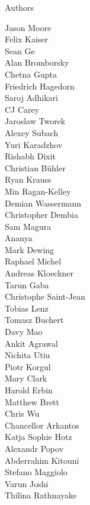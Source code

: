 \documentclass[xcolor=svgnames]{beamer}
\begin{document}
\begin{frame}{Authors}
\begin{multicols}{5}
Jason Moore\\
Felix Kaiser\\
Sean Ge\\
Alan Bromborsky\\
Chetna Gupta\\
Friedrich Hagedorn\\
Saroj Adhikari\\
CJ Carey\\
Jaroslaw Tworek\\
Alexey Subach\\
Yuri Karadzhov\\
Rishabh Dixit\\
Christian Bühler\\
Ryan Krauss\\
Min Ragan-Kelley\\
Demian Wassermann\\
Christopher Dembia\\
Sam Magura\\
Ananya\\
Mark Dewing\\
Raphael Michel\\
Andreas Kloeckner\\
Tarun Gaba\\
Christophe Saint-Jean\\
Tobias Lenz\\
Tomasz Buchert\\
Davy Mao\\
Ankit Agrawal\\
Nichita Utiu\\
Piotr Korgul\\
Mary Clark\\
Harold Erbin\\
Matthew Brett\\
Chris Wu\\
Chancellor Arkantos\\
Katja Sophie Hotz\\
Alexandr Popov\\
Abderrahim Kitouni\\
Stefano Maggiolo\\
Varun Joshi\\
Thilina Rathnayake\\
\end{multicols}
\end{frame}
\end{document}
